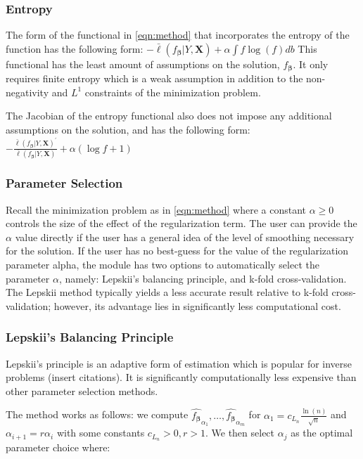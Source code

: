 \documentclass[a4paper,12pt]{article}
\newcommand{\bbeta}{{\boldsymbol{\beta}}}
\newcommand{\bX}{\mathbf{X}}
\begin{document}
\subsubsection{Entropy}
The form of the functional in \eqref{eqn:method} that incorporates the entropy of the function has the following form: $-\bar{\ell}(f_\bbeta|Y,\bX)+\alpha \int f \log(f)db$
This functional has the least amount of assumptions on the solution, $f_\bbeta$. It only requires finite entropy which is a weak assumption in addition to the non-negativity and $L^1$ constraints of the minimization problem.

The Jacobian of the entropy functional also does not impose any additional assumptions on the solution, and has the following form: $-\frac{\bar{\ell}(f_\bbeta|Y,\bX)^{\prime}}{\bar{\ell}(f_\bbeta|Y,\bX)}+\alpha (\log f+1)$

\subsubsection{Parameter Selection}
Recall the minimization problem as in \eqref{eqn:method} where a constant $\alpha \geq 0$ controls the size of the effect of the regularization term. The user can provide the $\alpha$ value directly if the user has a general idea of the level of smoothing necessary for the solution. If the user has no best-guess for the value of the regularization parameter alpha, the module has two options to automatically select the parameter $\alpha$, namely: Lepskii's balancing principle, and k-fold cross-validation. The Lepskii method typically yields a less accurate result relative to k-fold cross-validation; however, its advantage lies in significantly less computational cost.

\subsubsection{Lepskii's Balancing Principle}

Lepskii's principle is an adaptive form of estimation which is popular for inverse problems (insert citations). It is significantly computationally less expensive than other parameter selection methods.

The method works as follows: we compute $\hat{f_\bbeta}_{\alpha_{1}},\ldots,\hat{f_\bbeta}_{\alpha_{m}}$ for $\alpha_1 = c_{L_{n}} \frac{\ln(n)}{\sqrt{n}}$ and $\alpha_{i+1} = r\alpha_i$ with some constants $c_{L_{n}} >0,r>1$. We then select $\alpha_{j}$ as the optimal parameter choice where:
\end{document}
